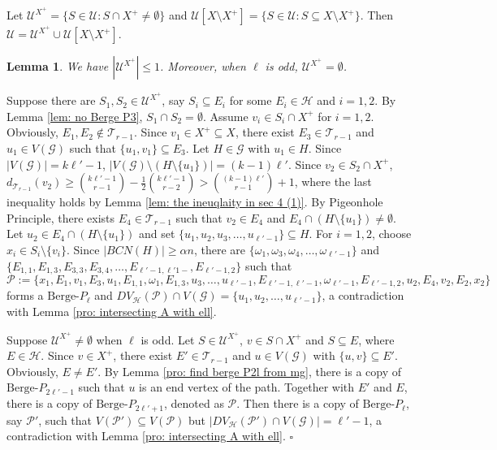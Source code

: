 \documentclass[12pt]{article}%
\newtheorem{lemma}[theorem]{Lemma}
\newenvironment{proof}{{\noindent\it Proof.}}{\hfill $\square$\par}
\newcommand{\ber}{\text{Berge-}}
\newcommand{\mh}{\mathcal{H}}
\newcommand{\mg}{\mathcal{G}}
\begin{document}
Let $\mathcal{U}^{X^+}=\{S\in \mathcal{U}: S\cap X^+\neq \emptyset\}$ and  $\mathcal{U}[X\setminus X^+]=\{S\in
\mathcal{U}:S\subseteq X\setminus X^+\}$.
Then $\mathcal{U}=\mathcal{U}^{X^+}\cup \mathcal{U}[X\setminus X^+]$.%
\begin{lemma}\label{lem: U X+ is small}
   We have $|\mathcal{U}^{X^+}|\leq 1$. Moreover, when $\ell$ is odd, $\mathcal{U}^{X^+}=\emptyset$.
\end{lemma}
\begin{proof}
Suppose there are  $S_1,S_2
\in \mathcal{U}^{X^+}$, say $S_i\subseteq E_i$ for some $E_i\in \mh$ and $i=1,2$. By Lemma \ref{lem: no Berge P3}, $S_1\cap S_2=\emptyset$. Assume  $v_i\in S_i\cap X^+$ for $i=1,2$. Obviously, $E_1,E_2\notin \mathcal{T}_{r-1}$. Since $v_1\in X^{+}\subseteq X$, there exist  $E_{3}\in \mathcal{T}_{r-1}$ and  $u_1\in V(\mg)$ such that $\{u_1,v_1\}\subseteq E_3.$ Let $H\in \mg$ with $u_1\in H$. Since $|V(\mg)|=k\ell'-1$,  $|V(\mg)\setminus (H\setminus \{u_1\})|=(k-1)\ell'$. Since $v_2\in S_2\cap X^{+}$,   $d_{\mathcal{T}_{r-1}}(v_2)\geq \binom{k\ell'-1}{r-1}-\frac{1}{2}\binom{k\ell'-1}{r-2}>\binom{(k-1)\ell'}{r-1}+1$, where the last inequality holds by Lemma \ref{lem: the ineuqlaity in sec 4 (1)}. By Pigeonhole Principle, there exists  $E_{4}\in \mathcal{T}_{r-1}$ such that $v_2\in E_4$ and $E_4\cap (H\setminus\{u_1\})\not=\emptyset$. Let $u_2\in E_4\cap (H\setminus\{u_1\})$ and set $\{u_1,u_2,u_3,\ldots,u_{\ell'-1}\}\subseteq H$.
  For $i=1,2$, choose $x_{i}\in S_{i}\setminus \{v_i\}.$ Since $|BCN(H)|\ge \alpha n$, there are  $\{\omega_1,\omega_3,\omega_4,\ldots,\omega_{\ell'-1}\}$ and $\{E_{1,1},E_{1,3},E_{3,3},E_{3,4},\ldots,E_{\ell'-1,\ell'1-},E_{\ell'-1,2}\}$ such that $$\mathcal{P}:=\{x_{1},E_1,v_1,E_3,u_1,E_{1,1},\omega_1,E_{1,3},u_3,\ldots,u_{\ell'-1},E_{\ell'-1,\ell'-1},\omega_{\ell'-1},E_{\ell'-1,2},u_{2},E_4,v_2,E_2,x_{2}\}$$ forms a $\ber P_{\ell}$ and  $DV_{\mh}(\mathcal{P})\cap V(\mg)=\{u_1,u_2,\ldots,u_{\ell'-1}\}$, a contradiction with Lemma \ref{pro: intersecting A with ell}.

Suppose $\mathcal{U}^{X^+}\not=\emptyset$ when $\ell$ is odd. Let $S\in \mathcal{U}^{X^+}$, $v\in S\cap X^+$ and $S\subseteq E$, where $E\in \mh$. Since $v\in X^+$, there exist  $E'\in \mathcal{T}_{r-1}$ and  $u\in V(\mg)$ with $\{u,v\}\subseteq E'$. Obviously, $E\neq E'$. By Lemma \ref{pro: find berge P2l from mg}, there is a copy of $\ber P_{2\ell'-1}$ such that $u$ is an end vertex of the path. Together with $E'$ and $E$, there is a copy of $\ber P_{2\ell'+1}$, denoted as $\mathcal{P}$. Then there is  a copy of $\ber P_\ell$, say $\mathcal{P}'$, such that $V(\mathcal{P}') \subseteq V(\mathcal{P})$ but $|DV_\mh(\mathcal{P}')\cap V(\mg)|= \ell'-1$, a contradiction with Lemma \ref{pro: intersecting A with ell}.
\end{proof}
\end{document}
